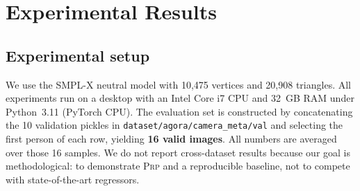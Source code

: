 \documentclass[twocolumn,10pt]{svjour3}
\newcommand{\prp}{\textsc{Prp}}
\begin{document}
\section{Experimental Results}
\label{sec:experiments}

\subsection{Experimental setup}
We use the SMPL-X neutral model with 10{,}475 vertices and 20{,}908 triangles. All experiments run on a desktop with an Intel Core i7 CPU and 32~GB RAM under Python~3.11 (PyTorch CPU). The evaluation set is constructed by concatenating the 10 validation pickles in \texttt{dataset/agora/camera\_meta/val} and selecting the first person of each row, yielding \textbf{16 valid images}. All numbers are averaged over those 16 samples. We do not report cross-dataset results because our goal is methodological: to demonstrate \prp{} and a reproducible baseline, not to compete with state-of-the-art regressors.
\end{document}
